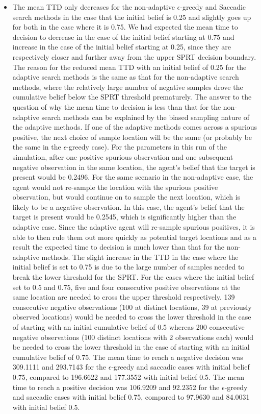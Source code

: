 \begin{itemize}
    \item The mean TTD only decreases for the non-adaptive $\epsilon$-greedy and Saccadic search methods in the case that the initial belief is 0.25 and slightly goes up for both in the case where it is 0.75. We had expected the mean time to decision to decrease in the case of the initial belief starting at 0.75 and increase in the case of the initial belief starting at 0.25, since they are respectively closer and further away from the upper SPRT decision boundary.
    The reason for the reduced mean TTD with an initial belief of 0.25 for the adaptive search methods is the same as that for the non-adaptive search methods, where the relatively large number of negative samples drove the cumulative belief below the SPRT threshold prematurely. The answer to the question of why the mean time to decision is less than that for the non-adaptive search methods can be explained by the biased sampling nature of the adaptive methods. If one of the adaptive methods comes across a spurious positive, the next choice of sample location will be the same (or probably be the same in the $\epsilon$-greedy case). For the parameters in this run of the simulation, after one positive spurious observation and one subsequent negative observation in the same location, the agent's belief that the target is present would be 0.2496. For the same scenario in the non-adaptive case, the agent would not re-sample the location with the spurious positive observation, but would continue on to sample the next location, which is likely to be a negative observation. In this case, the agent's belief that the target is present would be 0.2545, which is significantly higher than the adaptive case. Since the adaptive agent will re-sample spurious positives, it is able to then rule them out more quickly as potential target locations and as a result the expected time to decision is much lower than that for the non-adaptive methods. The slight increase in the TTD in the case where the initial belief is set to 0.75 is due to the large number of samples needed to break the lower threshold for the SPRT. For the cases where the initial belief set to 0.5 and 0.75, five and four consecutive positive observations at the same location are needed to cross the upper threshold respectively. 139 consecutive negative observations (100 at distinct locations, 39 at previously observed locations) would be needed to cross the lower threshold in the case of starting with an initial cumulative belief of 0.5 whereas 200 consecutive negative observations (100 distinct locations with 2 observations each) would be needed to cross the lower threshold in the case of starting with an initial cumulative belief of 0.75. The mean time to reach a negative decision was 309.1111 and 293.7143 for the $\epsilon$-greedy and saccadic cases with initial belief 0.75, compared to 196.6622 and 177.3552 with initial belief 0.5. The mean time to reach a positive decision was 106.9209 and 92.2352 for the $\epsilon$-greedy and saccadic cases with initial belief 0.75, compared to 97.9630 and 84.0031 with initial belief 0.5. 

\end{itemize}
